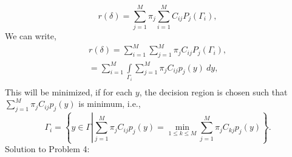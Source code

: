 \documentclass[a4paper,english,10pt]{article}
\begin{document}
\begin{equation*}
r(\delta)=\sum\limits_{j=1}^{M}\pi_j \sum\limits_{i=1}^{M} C_{ij} P_j(\Gamma_i),
\end{equation*}
We can write,
\begin{eqnarray*}
r(\delta)=\sum\limits_{i=1}^{M} \sum\limits_{j=1}^{M}\pi_j C_{ij} P_j(\Gamma_i),\\
=\sum\limits_{i=1}^{M} \int\limits_{\Gamma_i} \sum\limits_{j=1}^{M}\pi_j C_{ij} p_j(y)~dy,\\
\end{eqnarray*}
This will be minimized, if for each $y$, the decision region is chosen such that $\sum\limits_{j=1}^{M}\pi_j C_{ij} p_j(y)$ is minimum, i.e.,
\begin{equation*}
\Gamma_i=\left\lbrace y\in \Gamma \left|  \sum\limits_{j=1}^{M}\pi_j C_{ij} p_j(y)= \underset{1\leq k \leq M}{\min} \sum\limits_{j=1}^{M}\pi_j C_{kj} p_j(y)\right.\right\rbrace.
\end{equation*}
\hypertarget{solution4}{Solution to Problem 4:}
\end{document}
